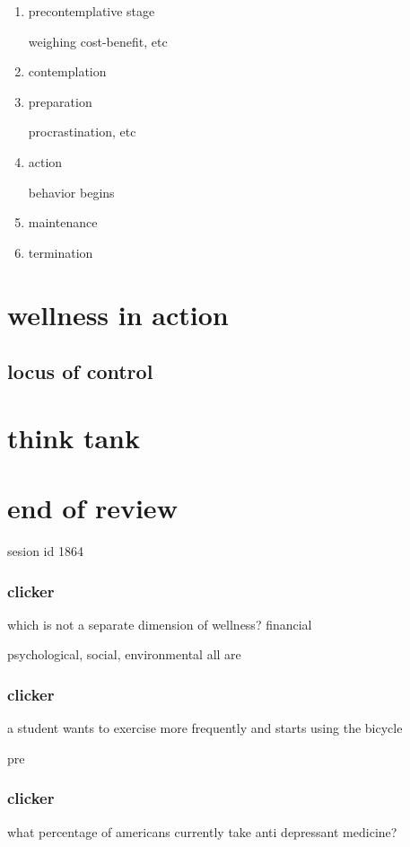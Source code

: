 \documentclass[letterpaper]{article}
\begin{document}
\begin{enumerate}
\item
precontemplative stage

weighing cost-benefit, etc

\item
contemplation
\item
preparation

procrastination, etc
\item
action

behavior begins
\item
maintenance
\item
termination
\end{enumerate}

\section*{wellness in action}
\subsection*{locus of control}

\section*{think tank}

\section*{end of review}
sesion id 1864

\subsubsection*{clicker}
which is not a separate dimension of wellness? financial

psychological, social, environmental all are

\subsubsection*{clicker}
a student wants to exercise more frequently and starts using the bicycle

pre

\subsubsection*{clicker}
what percentage of americans currently  take anti depressant medicine?
\end{document}
